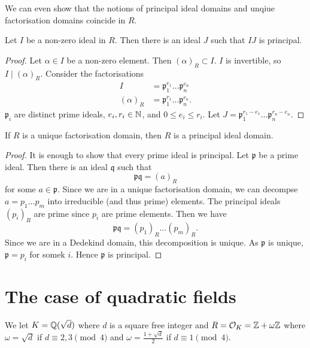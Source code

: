 We can even show that the notions of principal ideal domains and
unqiue factorisation domains coincide in $R$.

\begin{lemma}[]
	Let $I$ be a non-zero ideal in $R$.
	Then there is an ideal $J$ such that $IJ$ is principal.
\end{lemma}

\begin{proof}
	Let $\alpha \in I$ be a non-zero element.
	Then $(\alpha)_R \subset I$.
	$I$ is invertible, so $I \mid (\alpha)_R$.
	Consider the factorisations
	\begin{align*}
		I &= \mathfrak p^{e_1}_1 \ldots \mathfrak p_n^{e_n} \\
		(\alpha)_R &= \mathfrak p_1^{r_1} \ldots \mathfrak p_n^{r_n}.
	\end{align*}
	$\mathfrak p_i$ are distinct prime ideals, $e_i, r_i \in \mathbb{N}$, and
	$0 \leq e_i \leq r_i$.
	Let $J = \mathfrak p_1^{r_1 - e_1} \ldots \mathfrak p_n^{r_n - e_n}$.
\end{proof}

\begin{theorem}[]
	If $R$ is a unique factorisation domain, then $R$ is a principal ideal 
	domain.
\end{theorem}

\begin{proof}
	It is enough to show that every prime ideal is principal.
	Let $\mathfrak p$ be a prime ideal.
	Then there is an ideal $\mathfrak q$ such that
	\[
		\mathfrak{pq} = (a)_R
	\]
	for some $a \in \mathfrak p$.
	Since we are in a unique factorisation domain, we can decompse
	$a = p_1 \ldots p_m$ into irreducible (and thus prime) elements.
	The principal ideals $(p_i)_R$ are prime since $p_i$ are prime elements.
	Then we have \[
		\mathfrak{pq} = (p_1)_R \ldots (p_m)_R.
	\]
	Since we are in a Dedekind domain, this decomposition is unique.
	As $\mathfrak p$ is unique, $\mathfrak p = p_i$ for somek $i$.
	Hence $\mathfrak p$ is principal.
\end{proof}

\section{The case of quadratic fields}

We let $K = \mathbb{Q}(\sqrt d)$ where $d$ is a square free integer
and $R = \mathcal O_K = \mathbb{Z} + \omega\mathbb{Z}$ where $\omega = \sqrt d$
if $d \equiv 2,3 \pmod 4$ and $\omega = \frac{1+\sqrt d}2$ if
$d \equiv 1 \pmod 4$.

